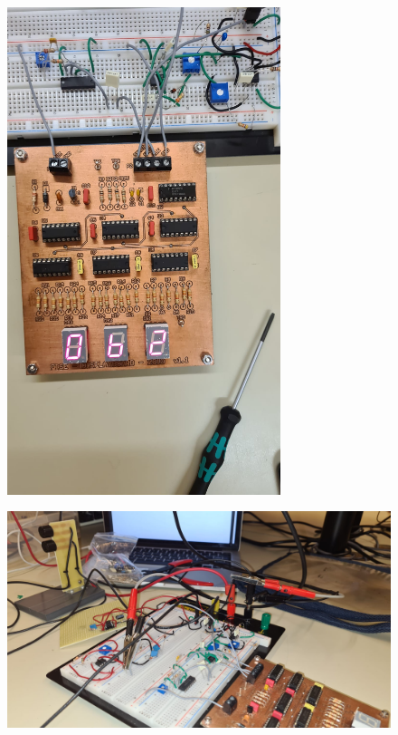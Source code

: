 \documentclass[12pt, a4papre]{article}
\begin{document}
	\begin{figure}[H]
		\begin{center}
		\includegraphics[width=80mm]{p4_15.jpeg}
		\end{center}
	\end{figure}
	
	\begin{figure}[H]
		\begin{center}
		\includegraphics[width=120mm]{p4_16.jpeg}
		\end{center}
	\end{figure}
	
\end{document}
